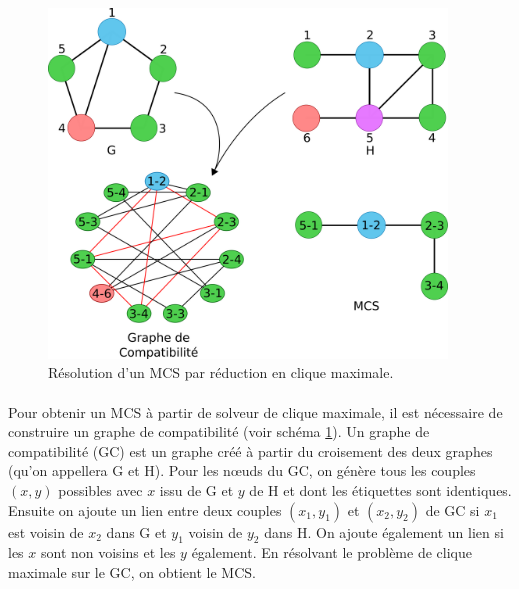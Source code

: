 \documentclass[12pt,french,twoside]{report}
\begin{document}
\begin{figure}[!ht]
  \begin{center}
    \includegraphics[width=400px]{Figures/s2m/MCS-SI/clique_solve.png}
    \caption{\label{clique_solve_fig}Résolution d'un MCS par réduction en clique maximale.}
  \end{center}
\end{figure}

\paragraph{}Pour obtenir un MCS à partir de solveur de clique maximale, il est nécessaire de construire un graphe de compatibilité (voir schéma \ref{clique_solve_fig}).
Un graphe de compatibilité (GC) est un graphe créé à partir du croisement des deux graphes (qu'on appellera G et H).
Pour les n\oe{}uds du GC, on génère tous les couples $(x, y)$ possibles avec $x$ issu de G et $y$ de H et dont les étiquettes sont identiques.
Ensuite on ajoute un lien entre deux couples $(x_1 , y_1)$ et $(x_2 , y_2)$ de GC si $x_1$ est voisin de $x_2$ dans G et $y_1$ voisin de $y_2$ dans H.
On ajoute également un lien si les $x$ sont non voisins et les $y$ également.
En résolvant le problème de clique maximale sur le GC, on obtient le MCS.
\end{document}
